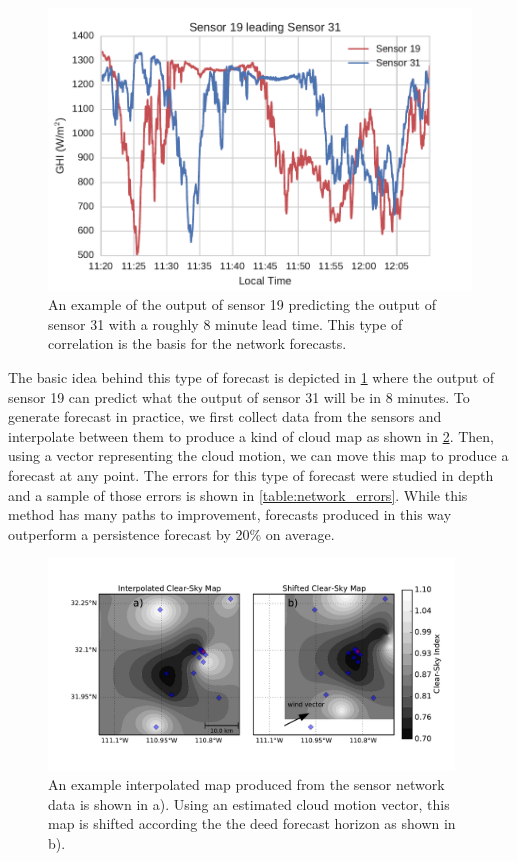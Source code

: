 \begin{figure}[htb]
\includegraphics[width=\textwidth]{figs/leading_sens.pdf}
\caption[One sensor predicting the output of another]{An example of
  the output of sensor 19 predicting the output of sensor 31 with a
  roughly 8 minute lead time. This type of correlation is the basis
  for the network forecasts.}
\label{fig:19leading31}
\end{figure}

The basic idea behind this type of forecast is depicted in
\cref{fig:19leading31} where the output of sensor 19 can predict what
the output of sensor 31 will be in 8 minutes.
To generate forecast in practice, we first collect data from the
sensors and interpolate between them to produce a kind of cloud map as
shown in \cref{fig:clearmap}.
Then, using a vector representing the cloud motion, we can move this
map to produce a forecast at any point.
The errors for this type of forecast were studied in depth and a
sample of those errors is shown in \cref{table:network_errors}.
While this method has many paths to improvement, forecasts produced in
this way outperform a persistence forecast by 20\% on average.

\begin{figure}[hbp]
\centering
\includegraphics[width=0.96\textwidth]{figs/clearmap.pdf}
\caption[Illustration of the network forecast methodology]{An example
  interpolated map produced from the sensor network data is shown in
  a). Using an estimated cloud motion vector, this map is shifted
  according the the deed forecast horizon as shown in b).}
\label{fig:clearmap}
\end{figure}

